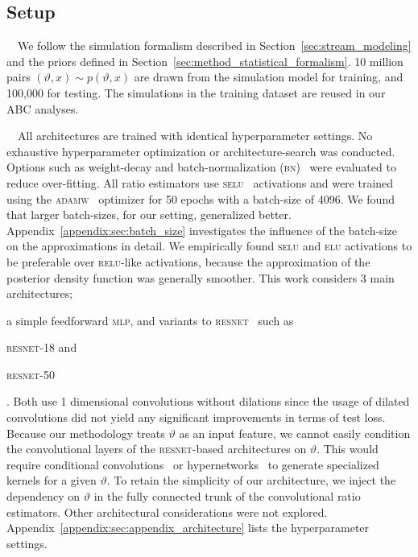 \documentclass[fleqn,usenatbib]{mnras}
\begin{document}
\subsection{Setup}
\label{sec:experiments_setup}

~~We follow the simulation formalism
described in Section~\ref{sec:stream_modeling} and the priors defined in
Section~\ref{sec:method_statistical_formalism}. 10 million
pairs $(\vartheta,x)\sim p(\vartheta,x)$ are drawn from the simulation model for training, and
100,000 for testing. The simulations in the training dataset are reused in our ABC analyses.

\medskip

~~All architectures are trained with identical hyperparameter settings.
No exhaustive hyperparameter optimization or architecture-search was conducted.
Options such as weight-decay and batch-normalization (\textsc{bn})~\citep{batchnorm} were evaluated to reduce over-fitting.
All ratio estimators
use \textsc{selu}~\citep{selu} activations and were trained using the \textsc{adamw}~\citep{adamw} optimizer for 50 epochs
with a batch-size of 4096. We found that larger batch-sizes, for our setting, generalized better.
Appendix~\ref{appendix:sec:batch_size} investigates the influence of the batch-size on the approximations in detail.
We empirically found \textsc{selu} and \textsc{elu} activations to be preferable over \textsc{relu}-like activations,
because the approximation of the posterior density function was generally smoother.
This work considers 3 main architectures;
\begin{enumerate*}[label=(\roman*)]
    \item a simple feedforward \textsc{mlp},
    and variants to \textsc{resnet}~\citep{resnet} such as
    \item \textsc{resnet-18} and \item \textsc{resnet-50}
\end{enumerate*}. Both use 1 dimensional convolutions without dilations
since the usage of dilated convolutions did not yield any significant improvements in terms of test loss.
Because our methodology treats $\vartheta$ as an input feature, we cannot easily
condition the convolutional layers of the \textsc{resnet}-based architectures on $\vartheta$.
This would require conditional convolutions~\citep{yang2019condconv} or hypernetworks~\citep{ha2016hypernetworks} to generate specialized kernels for a given $\vartheta$.
To retain the simplicity of our architecture, we inject the dependency on
$\vartheta$ in the fully connected trunk
of the convolutional ratio estimators.
Other architectural considerations were not explored.
Appendix~\ref{appendix:sec:appendix_architecture}
lists the hyperparameter settings.
\end{document}
